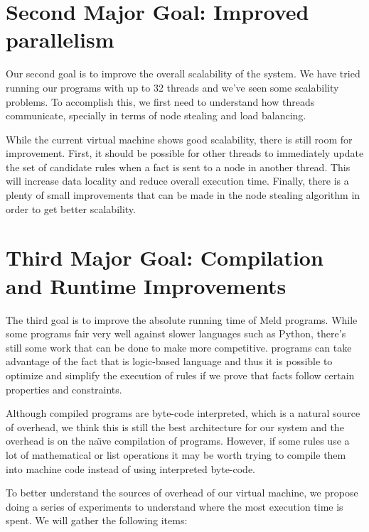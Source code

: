 \section{Second Major Goal: Improved parallelism}

Our second goal is to improve the overall scalability of the system. We have tried running our programs with up to 32 threads and we've seen
some scalability problems. To accomplish this, we first need to understand how
threads communicate, specially in terms of node stealing and load balancing.

While the current virtual machine shows good scalability, there is still room for improvement. First,
it should be possible for other threads to immediately update the set of candidate rules when a fact
is sent to a node in another thread. This will increase data locality and reduce overall execution time.
Finally, there is a plenty of small improvements that can be made in the node stealing algorithm in order to
get better scalability.

\section{Third Major Goal: Compilation and Runtime Improvements}

The third goal is to improve the absolute running time of Meld programs. While some programs fair very well against slower languages such as Python,
there's still some work that can be done to make \lang more competitive. \lang programs can take advantage of the fact that
\lang is logic-based language and thus it is possible to optimize and simplify the execution of rules
if we prove that facts follow certain properties and constraints.

Although compiled \lang programs are byte-code interpreted, which is a natural
source of overhead, we think this is still the best architecture for our system and the overhead
is on the na\"{\i}ve compilation of programs. However, 
if some rules use a lot of mathematical or list operations it may be worth trying to compile them into machine code instead of using interpreted byte-code.

To better understand the sources of overhead of our virtual machine, we propose doing a series
of experiments to understand where the most execution time is spent. We will gather the following
items:

